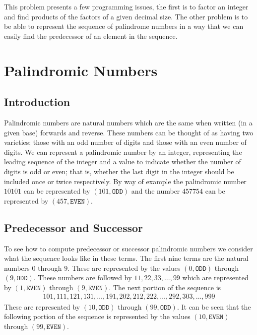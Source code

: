 \documentclass[oneside,12pt]{book}   	%
\newcounter{ex}
\newcounter{pr}
\theoremstyle{definition}
\begin{document}
\begin{spacing}{1.618}
			This problem presents a few programming issues, the first is to factor an integer and find products of the factors of a given decimal size. The other problem is to be able to represent the sequence of palindrome numbers in a way that we can easily find the predecessor of an element in the sequence.
			
		\section{Palindromic Numbers}
		
			\subsection{Introduction}
				Palindromic numbers are natural numbers which are the same when written (in a given base) forwards and reverse. These numbers can be thought of as having two varieties; those with an odd number of digits and those with an even number of digits.  We can represent a palindromic number by an integer, representing the leading sequence of the integer and a value to indicate whether the number of digits is odd or even; that is, whether the last digit in the integer should be included once or twice respectively. By way of example the palindromic number $10101$ can be represented by $(101, \mathtt{ODD})$ and the number $457754$ can be represented by $(457, \mathtt{EVEN})$. 
		
			\subsection{Predecessor and Successor}	
				To see how to compute predecessor or successor palindromic numbers we consider what the sequence looks like in these terms. The first nine terms are the natural numbers $0$ through $9$. These are represented by the values $(0, \mathtt{ODD})$ through $(9, \mathtt{ODD})$. These numbers are followed by $11, 22, 33, \dots, 99$ which are represented by $(1, \mathtt{EVEN})$ through $(9, \mathtt{EVEN})$. The next portion of the sequence is 
				\begin{alignat*}{4}
					101, 111, 121, 131, \dots, 191, 202, 212, 222, \dots, 292, 303, \dots, 999
				\end{alignat*}
				These are represented by $(10, \mathtt{ODD})$ through $(99, \mathtt{ODD})$. It can be seen that the following portion of the sequence is represented by the values $(10, \mathtt{EVEN})$ through $(99, \mathtt{EVEN})$. 
			

\end{spacing}
\end{document}
